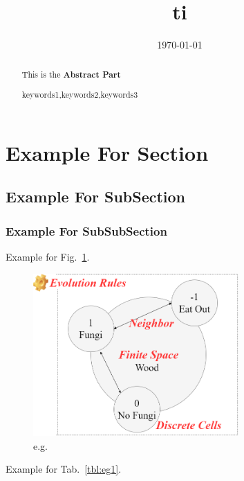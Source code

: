 \documentclass{mcmthesis}
\begin{document}
\linespread{0.6} %
\setlength{\parskip}{0.5\baselineskip} %
\title{ti}

\date{\today}
\begin{abstract}
 		This is the \textbf{Abstract Part}

	\begin{keywords}
	keywords1,keywords2,keywords3
	\end{keywords}
\end{abstract}

\maketitle

\tableofcontents
\newpage

\section{Example For Section}


\subsection{Example For SubSection}


\subsubsection{Example For SubSubSection }

Example for Fig.~\ref{fig:eg1}.

\begin{figure}[H]
	\centering
	\includegraphics[width = 0.7\textwidth]{CA.png} 
	\caption{e.g.}
	\label{fig:eg1}
\end{figure}

Example for Tab.~\ref{tbl:eg1}.
\end{document}
